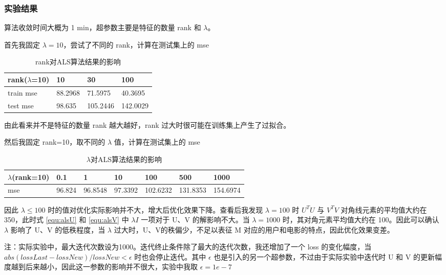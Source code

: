 \documentclass[UTF8,12pt]{ctexart}
\begin{document}
\subsubsection{实验结果}
算法收敛时间大概为 1 min，超参数主要是特征的数量 rank 和 $\lambda$。

首先我固定 $\lambda=10$，尝试了不同的 rank，计算在测试集上的 mse

\begin{table}[!htbp]
\centering
\begin{tabular}{|l|l|l|l|}
\hline
rank($\lambda$=10) & 10 & 30 & 100 \\ \hline
train mse & 88.2968 & 71.5975 & 40.3695 \\ \hline
test mse & 98.635 & 105.2446 & 142.0029 \\ \hline
\end{tabular}
\caption{rank对ALS算法结果的影响}
\end{table}

由此看来并不是特征的数量 rank 越大越好，rank 过大时很可能在训练集上产生了过拟合。

然后我固定 rank=10，取不同的 $\lambda$ 值，计算在测试集上的 mse

\begin{table}[!htbp]
\centering
\begin{tabular}{|l|l|l|l|l|l|l|}
\hline
$\lambda$(rank=10) & 0.1 & 1 & 10 & 100 & 500 & 1000 \\ \hline
mse & 96.824 & 96.8548 & 97.3392 & 102.6232 & 131.8353 & 154.6974 \\ \hline
\end{tabular}
\caption{$\lambda$对ALS算法结果的影响}
\end{table}

因此 $\lambda \le 100$ 时的值对优化实际影响并不大，增大后优化效果下降。查看后我发现 $\lambda = 100$ 时 $U^T U$ 与 $V^T V$ 对角线元素的平均值大约在 350，此时式 \ref{equ:alsU} 和 \ref{equ:alsV} 中 $\lambda I$ 一项对于 U、V 的解影响不大。当 $\lambda = 1000$ 时，其对角元素平均值大约在 100。因此可以确认 $\lambda$ 影响了 U、V 的低秩程度，当 $\lambda$ 过大时，U、V的秩偏少，不足以表征 M 对应的用户和电影的特点，因此优化效果变差。

注：实际实验中，最大迭代次数设为1000。迭代终止条件除了最大的迭代次数，我还增加了一个 loss 的变化幅度，当 $abs(lossLast - lossNew) / lossNew < \epsilon$ 时也会停止迭代。其中 $\epsilon$ 也是引入的另一个超参数，不过由于实际实验中迭代时 U 和 V 的更新幅度越到后来越小，因此这一参数的影响并不很大，实验中我取 $\epsilon=1e-7$
\end{document}
